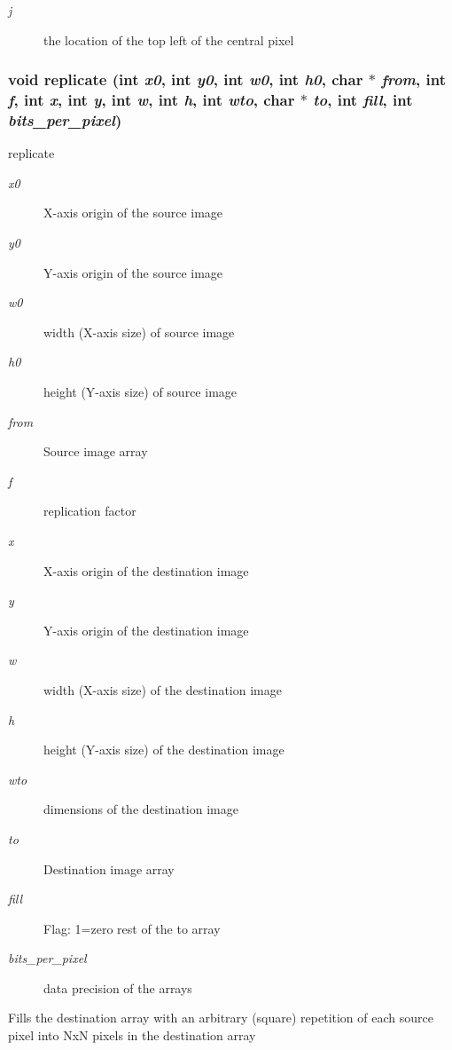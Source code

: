 \begin{Desc}
\item[Parameters:]
\begin{description}
\item[{\em j}]the location of the top left of the central pixel \end{description}
\end{Desc}
\subsubsection{\setlength{\rightskip}{0pt plus 5cm}void replicate (int {\em x0}, int {\em y0}, int {\em w0}, int {\em h0}, char $\ast$ {\em from}, int {\em f}, int {\em x}, int {\em y}, int {\em w}, int {\em h}, int {\em wto}, char $\ast$ {\em to}, int {\em fill}, int {\em bits\_\-per\_\-pixel})}\label{xtv_8h_a120}


replicate 

\begin{Desc}
\item[Parameters:]
\begin{description}
\item[{\em x0}]X-axis origin of the source image \item[{\em y0}]Y-axis origin of the source image \item[{\em w0}]width (X-axis size) of source image \item[{\em h0}]height (Y-axis size) of source image \item[{\em from}]Source image array \item[{\em f}]replication factor \item[{\em x}]X-axis origin of the destination image \item[{\em y}]Y-axis origin of the destination image \item[{\em w}]width (X-axis size) of the destination image \item[{\em h}]height (Y-axis size) of the destination image \item[{\em wto}]dimensions of the destination image \item[{\em to}]Destination image array \item[{\em fill}]Flag: 1=zero rest of the to array \item[{\em bits\_\-per\_\-pixel}]data precision of the arrays\end{description}
\end{Desc}
Fills the destination array with an arbitrary (square) repetition of each source pixel into Nx\-N pixels in the destination array

